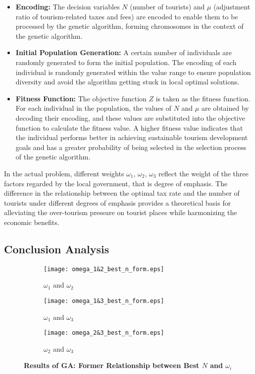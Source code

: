 \documentclass{mcmthesis}
\begin{document}
\begin{itemize}
  \item \textbf{Encoding: }{The decision variables $N$ (number of tourists) and $\mu$ (adjustment ratio of tourism-related taxes and fees) are encoded to enable them to be processed by the genetic algorithm, forming chromosomes in the context of the genetic algorithm.}
  \item \textbf{Initial Population Generation: }{A certain number of individuals are randomly generated to form the initial population. The encoding of each individual is randomly generated within the value range to ensure population diversity and avoid the algorithm getting stuck in local optimal solutions.}
  \item \textbf{Fitness Function: }{The objective function $Z$ is taken as the fitness function. For each individual in the population, the values of $N$ and $\mu$ are obtained by decoding their encoding, and these values are substituted into the objective function to calculate the fitness value. A higher fitness value indicates that the individual performs better in achieving sustainable tourism development goals and has a greater probability of being selected in the selection process of the genetic algorithm.\cite{5}\cite{6}}
\end{itemize}
{In the actual problem, different weights $\omega_1$, $\omega_2$, $\omega_3$ reflect the weight of the three factors regarded by the local government, that is degree of emphasis. The difference in the relationship between the optimal tax rate and the number of tourists under different degrees of emphasis provides a theoretical basis for alleviating the over-tourism pressure on tourist places while harmonizing the economic benefits.}
\subsection{Conclusion Analysis}
\begin{figure}[H]
  \centering
  \begin{subfigure}[b]{0.3\textwidth}
      \texttt{[image: omega\_1\&2\_best\_n\_form.eps]}
      \caption{$\omega_1$ and $\omega_2$}
      \label{fig:12Nf}
  \end{subfigure}
  \hfill
  \begin{subfigure}[b]{0.3\textwidth}
      \texttt{[image: omega\_1\&3\_best\_n\_form.eps]}
      \caption{$\omega_1$ and $\omega_3$}
      \label{fig:13Nf}
  \end{subfigure}
  \hfill
  \begin{subfigure}[b]{0.3\textwidth}
      \texttt{[image: omega\_2\&3\_best\_n\_form.eps]}
      \caption{$\omega_2$ and $\omega_3$}
      \label{fig:23Nf}
  \end{subfigure}
  \caption{\textbf{Results of GA: Former Relationship between Best $N$ and $\omega_i$}}
  \label{fig:Figure8}
\end{figure}
\end{document}
